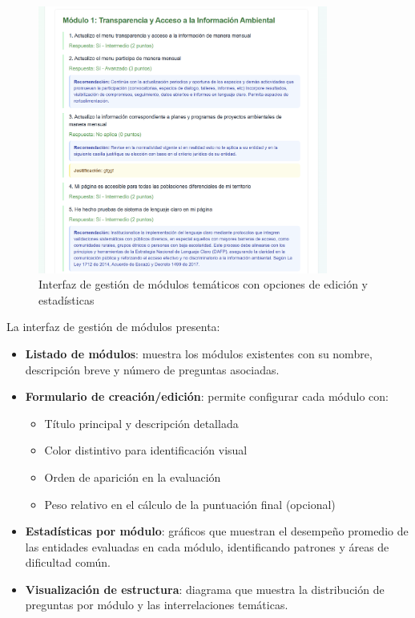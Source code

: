 \documentclass[12pt,a4paper]{report}
\begin{document}
\begin{figure}[h]
    \centering
    \includegraphics[width=0.85\textwidth]{Captura de pantalla 2025-06-26 122745.png}
    \caption{Interfaz de gestión de módulos temáticos con opciones de edición y estadísticas}
\end{figure}

La interfaz de gestión de módulos presenta:
\begin{itemize}[leftmargin=*]
    \item \textbf{Listado de módulos}: muestra los módulos existentes con su nombre, descripción breve y número de preguntas asociadas.
    \item \textbf{Formulario de creación/edición}: permite configurar cada módulo con:
    \begin{itemize}
        \item Título principal y descripción detallada
        \item Color distintivo para identificación visual
        \item Orden de aparición en la evaluación
        \item Peso relativo en el cálculo de la puntuación final (opcional)
    \end{itemize}
    \item \textbf{Estadísticas por módulo}: gráficos que muestran el desempeño promedio de las entidades evaluadas en cada módulo, identificando patrones y áreas de dificultad común.
    \item \textbf{Visualización de estructura}: diagrama que muestra la distribución de preguntas por módulo y las interrelaciones temáticas.
\end{itemize}
\end{document}
